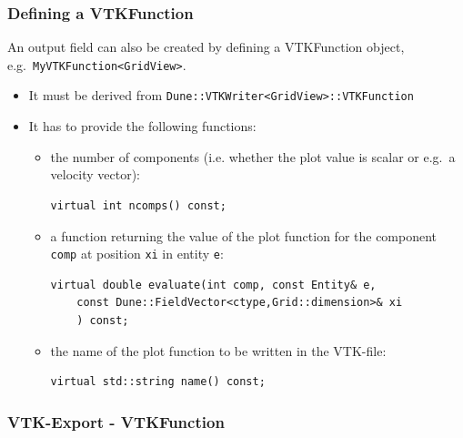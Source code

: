 \documentclass[ignorenonframetext,11pt]{beamer}
\theoremstyle{definition}
\begin{document}
\begin{frame}[fragile]
\frametitle{Defining a VTKFunction}
An output field can also be created by defining a VTKFunction object,
e.g.\ \lstinline!MyVTKFunction<GridView>!.
\begin{itemize}
\item It must be derived from
\lstinline!Dune::VTKWriter<GridView>::VTKFunction!
\item It has to provide the following functions:
\begin{itemize}
  \lstset{numbers=none}
\item the number of components (i.e. whether the plot value is scalar or
  e.g.\ a velocity vector):
  \begin{lstlisting}[numbers=none,basicstyle=\scriptsize\ttfamily]
virtual int ncomps() const;
  \end{lstlisting}
\item a function returning the value of the plot function for the component
  \lstinline!comp! at position \lstinline!xi! in entity \lstinline!e!:
  \begin{lstlisting}[numbers=none,basicstyle=\scriptsize\ttfamily]
virtual double evaluate(int comp, const Entity& e,
    const Dune::FieldVector<ctype,Grid::dimension>& xi
    ) const;
  \end{lstlisting}
\item the name of the plot function to be written in the VTK-file:
  \begin{lstlisting}[numbers=none,basicstyle=\scriptsize\ttfamily]
virtual std::string name() const;
  \end{lstlisting}
\end{itemize}
\end{itemize}
\end{frame}


\begin{frame}[allowframebreaks=1.0]
\frametitle{VTK-Export - VTKFunction}
\end{frame}

\end{document}
